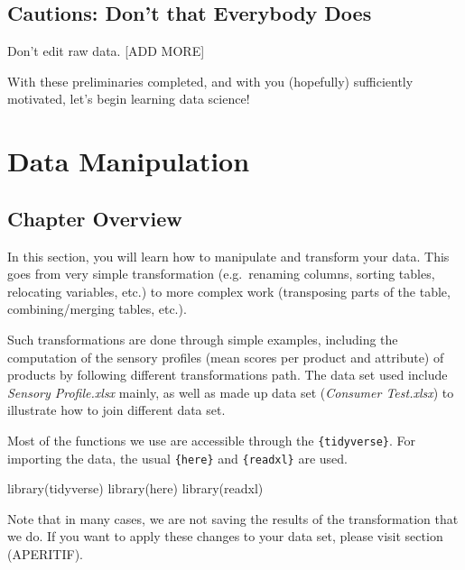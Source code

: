 \documentclass[
]{book}
\newenvironment{Shaded}{\begin{snugshade}}{\end{snugshade}}
\newcommand{\FunctionTok}[1]{\textcolor[rgb]{0.00,0.00,0.00}{#1}}
\newcommand{\NormalTok}[1]{#1}
\begin{document}
\hypertarget{cautions-dont-that-everybody-does}{%
\section{Cautions: Don't that Everybody Does}\label{cautions-dont-that-everybody-does}}

Don't edit raw data. {[}ADD MORE{]}

With these preliminaries completed, and with you (hopefully) sufficiently motivated, let's begin learning data science!

\hypertarget{data-manip}{%
\chapter{Data Manipulation}\label{data-manip}}

\hypertarget{chapter-overview}{%
\section{Chapter Overview}\label{chapter-overview}}

In this section, you will learn how to manipulate and transform your data. This goes from very simple transformation (e.g.~renaming columns, sorting tables, relocating variables, etc.) to more complex work (transposing parts of the table, combining/merging tables, etc.).

Such transformations are done through simple examples, including the computation of the sensory profiles (mean scores per product and attribute) of products by following different transformations path. The data set used include \emph{Sensory Profile.xlsx} mainly, as well as made up data set (\emph{Consumer Test.xlsx}) to illustrate how to join different data set.

Most of the functions we use are accessible through the \texttt{\{tidyverse\}}. For importing the data, the usual \texttt{\{here\}} and \texttt{\{readxl\}} are used.

\begin{Shaded}
\begin{Highlighting}[]
\FunctionTok{library}\NormalTok{(tidyverse)}
\FunctionTok{library}\NormalTok{(here)}
\FunctionTok{library}\NormalTok{(readxl)}
\end{Highlighting}
\end{Shaded}

Note that in many cases, we are not saving the results of the transformation that we do. If you want to apply these changes to your data set, please visit section (APERITIF).
\end{document}
